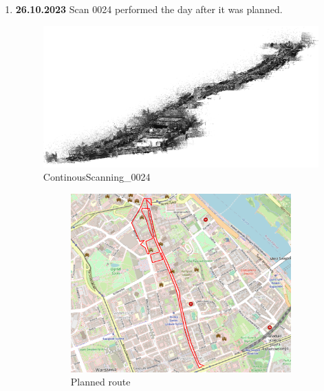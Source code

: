 \documentclass[a4paper,12pt]{book}
\begin{document}
\begin{enumerate}
	\item \textbf{26.10.2023} Scan 0024 performed the day after it was planned.
	\begin{figure}[H]
		\includegraphics[width=1\linewidth]{cloud24}
		\caption{ContinousScanning\_0024}
	\end{figure}
	\begin{figure}[H]
		\centering
		\begin{subfigure}{.80\textwidth}
			\centering
			\includegraphics[width=1\linewidth]{route_p24}
			\caption{Planned route}
			\label{fig:a24}
		\end{subfigure}%
		\linebreak
		\begin{subfigure}{.80\textwidth}
			\centering

\end{subfigure}
\end{figure}
\end{enumerate}
\end{document}
